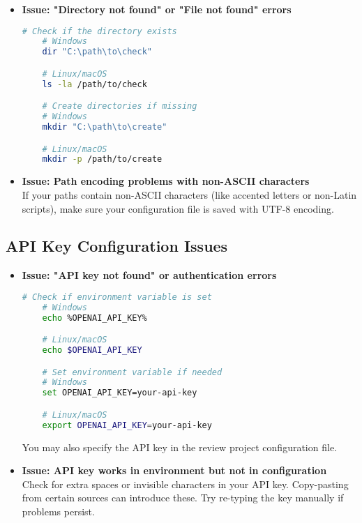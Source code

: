\begin{itemize}
    \item \textbf{Issue: "Directory not found" or "File not found" errors}

    \begin{commandbox}
    \begin{lstlisting}[language=Bash]
    # Check if the directory exists
    # Windows
    dir "C:\path\to\check"

    # Linux/macOS
    ls -la /path/to/check

    # Create directories if missing
    # Windows
    mkdir "C:\path\to\create"

    # Linux/macOS
    mkdir -p /path/to/create
    \end{lstlisting}
    \end{commandbox}

    \item \textbf{Issue: Path encoding problems with non-ASCII characters}
    \\
    If your paths contain non-ASCII characters (like accented letters or non-Latin scripts), make sure your configuration file is saved with UTF-8 encoding.
\end{itemize}

\subsection{API Key Configuration Issues}

\begin{itemize}
    \item \textbf{Issue: "API key not found" or authentication errors}

    \begin{commandbox}
    \begin{lstlisting}[language=Bash]
    # Check if environment variable is set
    # Windows
    echo %OPENAI_API_KEY%

    # Linux/macOS
    echo $OPENAI_API_KEY

    # Set environment variable if needed
    # Windows
    set OPENAI_API_KEY=your-api-key

    # Linux/macOS
    export OPENAI_API_KEY=your-api-key
    \end{lstlisting}
    \end{commandbox}
    You may also specify the API key in the review project configuration file.

    \item \textbf{Issue: API key works in environment but not in configuration}
    \\
    Check for extra spaces or invisible characters in your API key. Copy-pasting from certain sources can introduce these. Try re-typing the key manually if problems persist.
\end{itemize}

